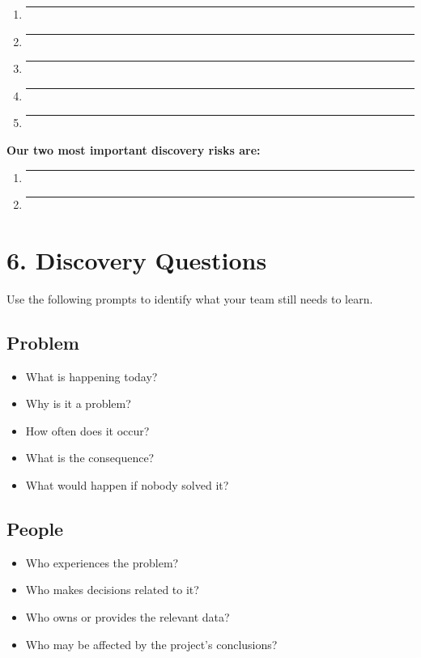 \documentclass[11pt]{article}
\begin{document}
\begin{enumerate}[leftmargin=*]
    \item \rule{0.88\textwidth}{0.4pt}
    \item \rule{0.88\textwidth}{0.4pt}
    \item \rule{0.88\textwidth}{0.4pt}
    \item \rule{0.88\textwidth}{0.4pt}
    \item \rule{0.88\textwidth}{0.4pt}
\end{enumerate}

\textbf{Our two most important discovery risks are:}

\begin{enumerate}[leftmargin=*]
    \item \rule{0.88\textwidth}{0.4pt}
    \item \rule{0.88\textwidth}{0.4pt}
\end{enumerate}

\section*{6. Discovery Questions}

Use the following prompts to identify what your team still needs to learn.

\subsection*{Problem}
\begin{itemize}[leftmargin=*]
    \item What is happening today?
    \item Why is it a problem?
    \item How often does it occur?
    \item What is the consequence?
    \item What would happen if nobody solved it?
\end{itemize}

\subsection*{People}
\begin{itemize}[leftmargin=*]
    \item Who experiences the problem?
    \item Who makes decisions related to it?
    \item Who owns or provides the relevant data?
    \item Who may be affected by the project's conclusions?
\end{itemize}
\end{document}
